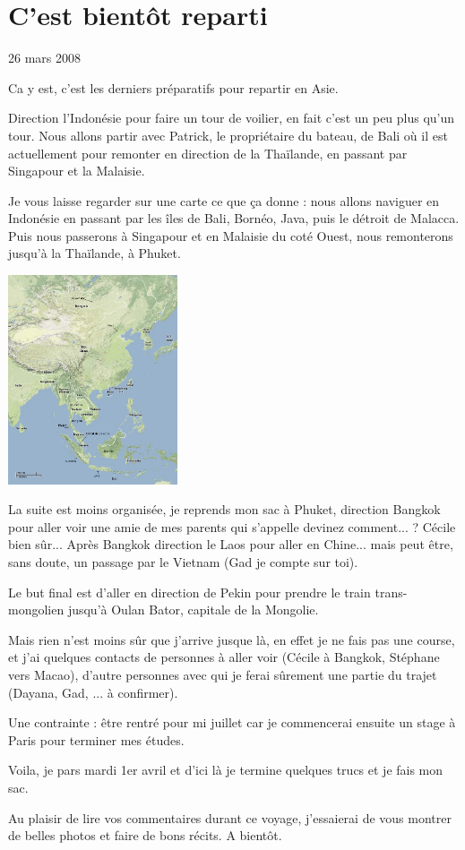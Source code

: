\section{C'est bientôt reparti}

26 mars 2008

\begin{multicols}{2}

Ca y est, c'est les derniers préparatifs pour repartir en Asie.

Direction l'Indonésie pour faire un tour de voilier, en fait c'est un peu plus qu'un tour. Nous allons partir avec Patrick, le propriétaire du bateau, de Bali où il est actuellement pour remonter en direction de la Thaïlande, en passant par Singapour et la Malaisie.

Je vous laisse regarder sur une carte ce que ça donne : nous allons naviguer en Indonésie en passant par les îles de Bali, Bornéo, Java, puis le détroit de Malacca. Puis nous passerons à Singapour et en Malaisie du coté Ouest, nous remonterons jusqu'à la Thaïlande, à Phuket.

\smallbreak
\hspace*{-0.65cm}
\includegraphics[width=5cm]{articles/C-est-bientot-reparti/trip.png}
\smallbreak

La suite est moins organisée, je reprends mon sac à Phuket, direction Bangkok pour aller voir une amie de mes parents qui s'appelle devinez comment... ? Cécile bien sûr... Après Bangkok direction le Laos pour aller en Chine... mais peut être, sans doute, un passage par le Vietnam (Gad je compte sur toi).

Le but final est d'aller en direction de Pekin pour prendre le train trans-mongolien jusqu'à Oulan Bator, capitale de la Mongolie.

Mais rien n'est moins sûr que j'arrive jusque là, en effet je ne fais pas une course, et j'ai quelques contacts de personnes à aller voir (Cécile à Bangkok, Stéphane vers Macao), d'autre personnes avec qui je ferai sûrement une partie du trajet (Dayana, Gad, ... à confirmer).

Une contrainte : être rentré pour mi juillet car je commencerai ensuite un stage à Paris pour terminer mes études.

Voila, je pars mardi 1er avril et d'ici là je termine quelques trucs et je fais mon sac.

Au plaisir de lire vos commentaires durant ce voyage, j'essaierai de vous montrer de belles photos et faire de bons récits. A bientôt.

\end{multicols}


